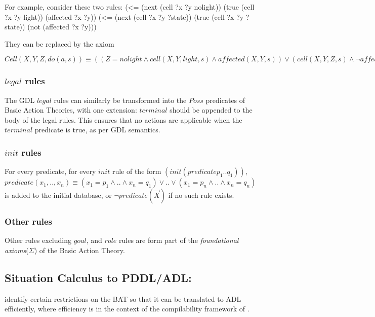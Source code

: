 \documentclass{article}
\begin{document}
For example, consider these two rules:\newline
(<= (next (cell ?x ?y nolight))
        (true (cell ?x ?y light))
        (affected ?x ?y)) \newline\newline
(<= (next (cell ?x ?y ?state))
        (true (cell ?x ?y ?state))
        (not (affected ?x ?y)))\newline\newline

They can be replaced by the axiom

$Cell(X,Y,Z,do(a,s))\equiv((Z=nolight\land cell(X,Y,light,s)\land affected(X,Y,s)) \lor (cell(X,Y,Z,s)\land \neg affected(X,Y,s)))$

\subsubsection{$legal$ rules}
The GDL $legal$ rules can similarly be transformed into the $Poss$ predicates of Basic Action Theories, with one extension: $terminal$ should be appended to the body of the legal rules. This ensures that no actions are applicable when the $terminal$ predicate is true, as per GDL semantics.

\subsubsection{$init$ rules}
For every predicate, for every $init$ rule of the form $(init (predicate p_{1} .. q_{1}))$,   $predicate(x_{1},..,x_{n})\equiv (x_{1}=p_{1} \land .. \land x_{n}=q_{1}) \lor .. \lor (x_{1}=p_{n} \land .. \land x_{n}=q_{n}) $ is added to the initial database, or $\neg predicate(\vec{X})$ if no such rule exists.

\subsubsection{Other rules}
Other rules excluding $goal$, and $role$ rules are form part
of the \emph{foundational axioms}($\Sigma$)\emph{ }of the Basic
Action Theory.

\subsection{Situation Calculus to PDDL/ADL:}

\cite{roeger:kr} identify certain restrictions on the BAT so that
it can be translated to ADL efficiently, where efficiency is in the
context of the compilability framework of \cite{nebel:jair-2000}.
\end{document}
